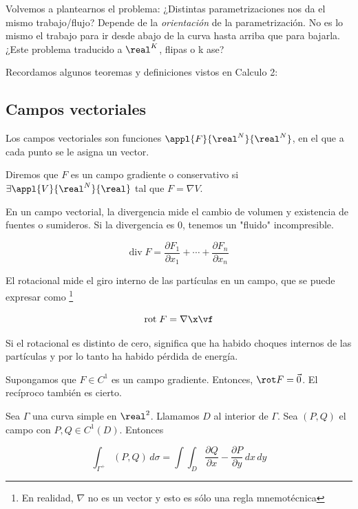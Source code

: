 Volvemos a plantearnos el problema: ¿Distintas parametrizaciones nos da el mismo trabajo/flujo? Depende de la \textit{orientación} de la parametrización. No es lo mismo el trabajo para ir desde abajo de la curva hasta arriba que para bajarla. ¿Este problema traducido a $\real^K$, flipas o k ase?


Recordamos algunos teoremas y definiciones vistos en Calculo 2:

\subsection{Campos vectoriales}
Los campos vectoriales son funciones $\appl{F}{\real^N}{\real^N}$, en el que a cada punto se le asigna un vector.

\begin{defn}
Diremos que $F$ es un campo gradiente o conservativo si $\exists \appl{V}{\real^N}{\real}$ tal que $F=\nabla V$.
\end{defn}

\begin{defn}[Divergencia]
En un campo vectorial, la divergencia mide el cambio de volumen y existencia de fuentes o sumideros. Si la divergencia es 0, tenemos un "fluido" incompresible.

\[ \textrm{div}\;F = \frac{∂F_1}{∂x_1} + \cdots + \frac{∂F_n}{∂x_n} \]
\end{defn}

\begin{defn}[Rotacional]
El rotacional mide el giro interno de las partículas en un campo, que se puede expresar como \footnote{En realidad, $\nabla$ no es un vector y esto es sólo una regla mnemotécnica}

\[ \textrm{rot}\;F = \nabla \x \vf \]

Si el rotacional es distinto de cero, significa que ha habido choques internos de las partículas y por lo tanto ha habido pérdida de energía.
\end{defn}

\begin{theorem}
Supongamos que $F\in C^1$ es un campo gradiente. Entonces, $\rot F = \vec{0}$. El recíproco también es cierto.
\end{theorem}


\begin{theorem}
Sea $\Gamma$ una curva simple en $\real^2$. Llamamos $D$ al interior de $\Gamma$. Sea $(P,Q)$ el campo con $P,Q\in C^1(D)$. Entonces

\[ \int_{\Gamma^+} (P,Q)\,d\sigma = \int\int_D \frac{\partial Q}{\partial x}-\frac{\partial P}{\partial y}\,dx\,dy\]
\end{theorem}

